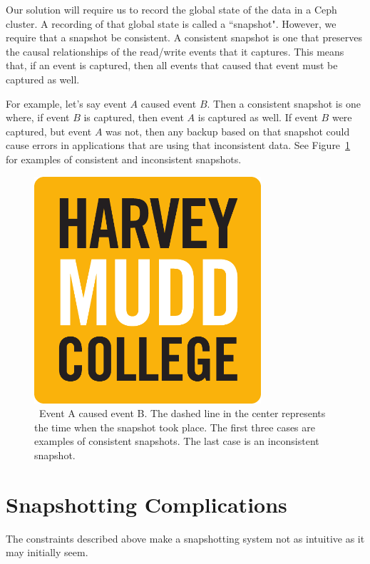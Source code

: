 Our solution will require us to record the global state of the data in a Ceph 
cluster. A recording of that global state is called a ``snapshot". However, we 
require that a snapshot be consistent. A consistent snapshot is one that 
preserves the causal relationships of the read/write events that it captures.
This means that, if an event is captured, then all events that caused that 
event must be captured as well. 

For example, let's say event $A$ caused event $B$. Then a consistent snapshot 
is one where, if event $B$ is captured, then event $A$ is captured as well. If
event $B$ were captured, but event $A$ was not, then any backup based on that
snapshot could cause errors in applications that are using that inconsistent
data. See Figure~\ref{fig:consistency} for examples of consistent and 
inconsistent snapshots.

\begin{figure}[h]
  \centering
  \caption{~Event A caused event B. The dashed line in the center represents the time when the snapshot took place. The first three cases are examples of consistent snapshots. The last case is an inconsistent snapshot.} 
  \label{fig:consistency}
  \includegraphics[width=0.75\textwidth]{hmclogo.pdf}%
\end{figure}

\section{Snapshotting Complications}

The constraints described above make a snapshotting system not as intuitive as
it may initially seem.

